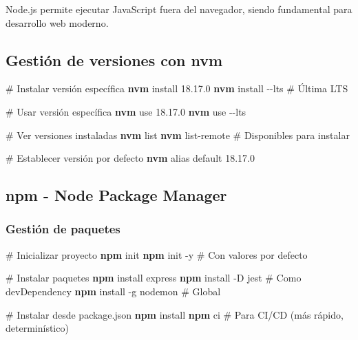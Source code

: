 \documentclass[
  11pt,
  letterpaper,
  oneside,
  openany]{scrbook}
\newenvironment{Shaded}{}{}
\newcommand{\AttributeTok}[1]{\textcolor[rgb]{0.84,0.23,0.29}{#1}}
\newcommand{\CommentTok}[1]{\textcolor[rgb]{0.42,0.45,0.49}{#1}}
\newcommand{\ExtensionTok}[1]{\textcolor[rgb]{0.84,0.23,0.29}{\textbf{#1}}}
\newcommand{\NormalTok}[1]{\textcolor[rgb]{0.14,0.16,0.18}{#1}}
\begin{document}
Node.js permite ejecutar JavaScript fuera del navegador, siendo
fundamental para desarrollo web moderno.

\subsection{Gestión de versiones con
nvm}\label{gestiuxf3n-de-versiones-con-nvm}

\begin{Shaded}
\begin{Highlighting}[]
\CommentTok{\# Instalar versión específica}
\ExtensionTok{nvm}\NormalTok{ install 18.17.0}
\ExtensionTok{nvm}\NormalTok{ install }\AttributeTok{{-}{-}lts}  \CommentTok{\# Última LTS}

\CommentTok{\# Usar versión específica}
\ExtensionTok{nvm}\NormalTok{ use 18.17.0}
\ExtensionTok{nvm}\NormalTok{ use }\AttributeTok{{-}{-}lts}

\CommentTok{\# Ver versiones instaladas}
\ExtensionTok{nvm}\NormalTok{ list}
\ExtensionTok{nvm}\NormalTok{ list{-}remote  }\CommentTok{\# Disponibles para instalar}

\CommentTok{\# Establecer versión por defecto}
\ExtensionTok{nvm}\NormalTok{ alias default 18.17.0}
\end{Highlighting}
\end{Shaded}

\subsection{npm - Node Package
Manager}\label{npm---node-package-manager}

\subsubsection{Gestión de paquetes}\label{gestiuxf3n-de-paquetes}

\begin{Shaded}
\begin{Highlighting}[]
\CommentTok{\# Inicializar proyecto}
\ExtensionTok{npm}\NormalTok{ init}
\ExtensionTok{npm}\NormalTok{ init }\AttributeTok{{-}y}  \CommentTok{\# Con valores por defecto}

\CommentTok{\# Instalar paquetes}
\ExtensionTok{npm}\NormalTok{ install express}
\ExtensionTok{npm}\NormalTok{ install }\AttributeTok{{-}D}\NormalTok{ jest  }\CommentTok{\# Como devDependency}
\ExtensionTok{npm}\NormalTok{ install }\AttributeTok{{-}g}\NormalTok{ nodemon  }\CommentTok{\# Global}

\CommentTok{\# Instalar desde package.json}
\ExtensionTok{npm}\NormalTok{ install}
\ExtensionTok{npm}\NormalTok{ ci  }\CommentTok{\# Para CI/CD (más rápido, determinístico)}
\end{Highlighting}
\end{Shaded}
\end{document}
